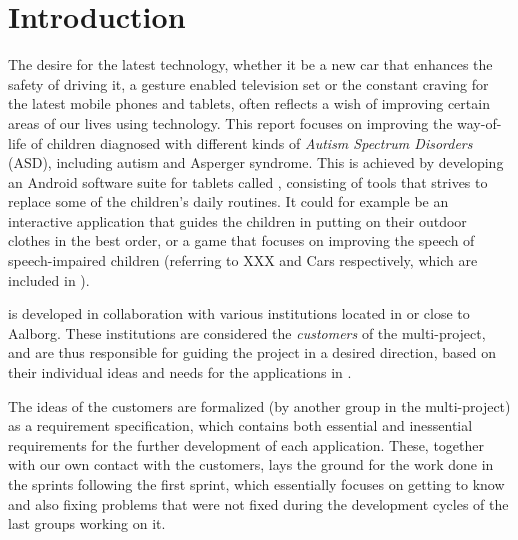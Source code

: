 \newcommand{\headerIntroduction}{Introduction}
\chapter*{\headerIntroduction}\label{chap:introduction}
\addcontentsline{toc}{chapter}{\headerIntroduction}

The desire for the latest technology, whether it be a new car that enhances the safety of driving it, a gesture enabled television set or the constant craving for the latest mobile phones and tablets, often reflects a wish of improving certain areas of our lives using technology.
This report focuses on improving the way-of-life of children diagnosed with different kinds of \textit{Autism Spectrum Disorders} (ASD), including autism and Asperger syndrome.
This is achieved by developing an Android software suite for tablets called \giraf, consisting of tools that strives to replace some of the children's daily routines.
It could for example be an interactive application that guides the children in putting on their outdoor clothes in the best order, or a game that focuses on improving the speech of speech-impaired children (referring to XXX and Cars respectively, which are included in \giraf).

\giraf is developed in collaboration with various institutions located in or close to Aalborg.
These institutions are considered the \textit{customers} of the multi-project, and are thus responsible for guiding the project in a desired direction, based on their individual ideas and needs for the applications in \giraf.


The ideas of the customers are formalized (by another group in the multi-project) as a requirement specification, which contains both essential and inessential requirements for the further development of each application.
These, together with our own contact with the customers, lays the ground for the work done in the sprints following the first sprint, which essentially focuses on getting to know \giraf and also fixing problems that were not fixed during the development cycles of the last groups working on it.

